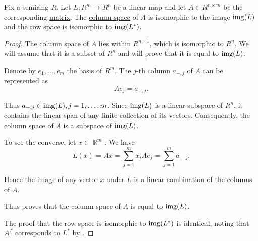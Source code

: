 \begin{proposition}\label{thm:column_and_row_spaces_are_images}
  Fix a semiring \( R \). Let \( L: R^m \to R^n \) be a linear map and let \( A \in R^{n \times m} \) be the corresponding \hyperref[thm:finite_dimensional_operators_are_isomorphic_to_matrices]{matrix}. The \hyperref[def:matrix_column_and_row_space]{column space} of \( A \) is isomorphic to the image \( \operatorname{img}(L) \) and the row space is isomorphic to \( \operatorname{img}(L^*) \).
\end{proposition}
\begin{proof}
  The column space of \( A \) lies within \( R^{n \times 1} \), which is isomorphic to \( R^n \). We will assume that it is a subset of \( R^n \) and will prove that it is equal to \( \operatorname{img}(L) \).

  Denote by \( e_1, \ldots, e_m \) the basis of \( R^m \). The \( j \)-th column \( a_{-,j} \) of \( A \) can be represented as
  \begin{equation*}
    A e_j = a_{-,j}.
  \end{equation*}

  Thus \( a_{-,j} \in \operatorname{img}(L), j = 1, \ldots, m \). Since \( \operatorname{img}(L) \) is a linear subspace of \( R^n \), it contains the linear span of any finite collection of its vectors. Consequently, the column space of \( A \) is a subspace of \( \operatorname{img}(L) \).

  To see the converse, let \( x \in \BbbR^m \). We have
  \begin{equation*}
    L(x) = Ax = \sum_{j=1}^m x_i A e_j = \sum_{j=1}^m a_{-,j}.
  \end{equation*}

  Hence the image of any vector \( x \) under \( L \) is a linear combination of the columns of \( A \).

  Thus proves that the column space of \( A \) is equal to \( \operatorname{img}(L) \).

  The proof that the row space is isomorphic to \( \operatorname{img}(L^*) \) is identical, noting that \( A^T \) corresponds to \( L^* \) by .
\end{proof}
